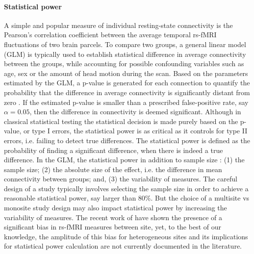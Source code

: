 \documentclass[authoryear]{elsarticle}
\begin{document}
\paragraph{Statistical power}
A simple and popular measure of individual resting-state connectivity is the Pearson’s correlation coefficient between the average temporal rs-fMRI fluctuations of two brain parcels. To compare two groups, a general linear model (GLM) is typically used to establish statistical difference in average connectivity between the groups, while accounting for possible confounding variables such as age, sex or the amount of head motion during the scan. Based on the parameters estimated by the GLM, a p-value is generated for each connection to quantify the probability that the difference in average connectivity is significantly distant from zero \citep{Worsley1995}. If the estimated p-value is smaller than a prescribed false-positive rate, say $\alpha=0.05$, then the difference in connectivity is deemed significant. Although in classical statistical testing the statistical decision is made purely based on the p-value, or type I errors, the statistical power is as critical as it controls for type II errors, i.e. failing to detect true differences. The statistical power is defined as the probability of finding a significant difference, when there is indeed a true difference. In the GLM, the statistical power in addition to sample size \citep{Desmond2002}: (1) the sample size; (2) the absolute size of the effect, i.e. the difference in mean connectivity between groups; and, (3) the variability of measures. 
The careful design of a study typically involves selecting the sample size in order to achieve a reasonable statistical power, say larger than $80\%$. But the choice of a multisite vs monosite study design may also impact statistical power by increasing the variability of measures. The recent work of \cite{Yang2014} have shown the presence of a significant bias in rs-fMRI measures between site, yet, to the best of our knowledge, the amplitude of this bias for heterogeneous sites and its implications for statistical power calculation are not currently documented in the literature. 
\end{document}
